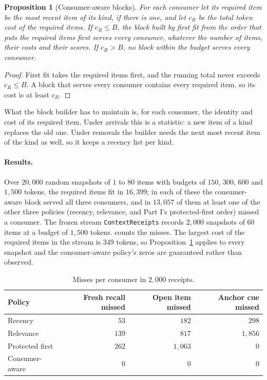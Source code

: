 \documentclass[11pt]{article}
\newcommand{\code}[1]{\texttt{#1}}
\theoremstyle{definition}
\theoremstyle{plain}
\newtheorem{proposition}[definition]{Proposition}
\begin{document}
\begin{proposition}[Consumer-aware blocks]\label{prop:block}
For each consumer let its required item be the most recent item of its kind, if there is one, and
let $c_R$ be the total token cost of the required items. If $c_R\le B$, the block built by first fit
from the order that puts the required items first serves every consumer, whatever the number of
items, their costs and their scores. If $c_R>B$, no block within the budget serves every consumer.
\end{proposition}

\begin{proof}
First fit takes the required items first, and the running total never exceeds $c_R\le B$. A block
that serves every consumer contains every required item, so its cost is at least $c_R$.
\end{proof}

What the block builder has to maintain is, for each consumer, the identity and cost of its required
item. Under arrivals this is a statistic: a new item of a kind replaces the old one. Under removals
the builder needs the next most recent item of the kind as well, so it keeps a recency list per
kind.

\paragraph{Results.} Over $20{,}000$ random snapshots of $1$ to $80$ items with budgets of $150$,
$300$, $600$ and $1{,}500$ tokens, the required items fit in $16{,}399$; in each of these the
consumer-aware block served all three consumers, and in $13{,}057$ of them at least one of the other
three policies (recency, relevance, and Part I's protected-first order) missed a consumer. The
frozen stream \code{ContextReceipts} records $2{,}000$ snapshots of $60$ items at a budget of
$1{,}500$ tokens.  counts the misses. The largest cost of the required items in the
stream is $349$ tokens, so Proposition~\ref{prop:block} applies to every snapshot and the
consumer-aware policy's zeros are guaranteed rather than observed.

\begin{table}[ht]
\centering\small
\begin{tabular}{lrrr}
\toprule
Policy & Fresh recall missed & Open item missed & Anchor cue missed\\
\midrule
Recency & $53$ & $182$ & $298$\\
Relevance & $139$ & $817$ & $1{,}856$\\
Protected first & $262$ & $1{,}063$ & $0$\\
Consumer-aware & $0$ & $0$ & $0$\\
\bottomrule
\end{tabular}
\caption{Misses per consumer in $2{,}000$ receipts.}\label{tab:lp2}
\end{table}
\end{document}
